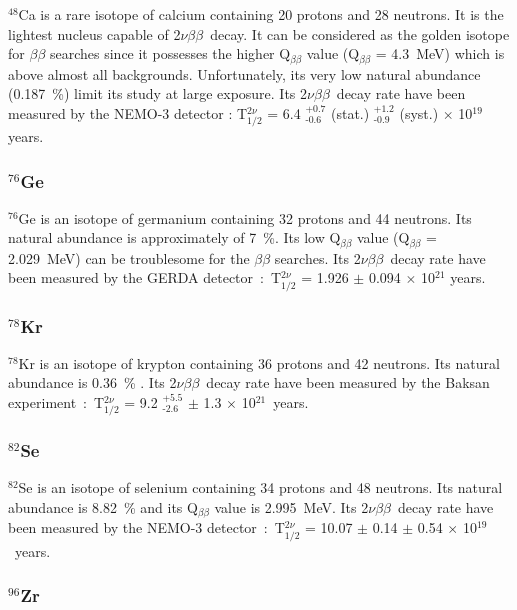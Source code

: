 \documentclass[main.tex]{subfiles}
\begin{document}
\NI $^\text{48}$Ca is a rare isotope of calcium containing 20 protons and 28 neutrons. It is the lightest nucleus capable of 2$\nu\beta\beta$~decay. It can be considered as the golden isotope for $\beta\beta$ searches since it possesses the higher Q$_{\beta\beta}$ value (Q$_{\beta\beta}$ = 4.3~MeV) which is above almost all backgrounds. Unfortunately, its very low natural abundance (0.187~\%) limit its study at large exposure. Its 2$\nu\beta\beta$~decay rate have been measured by the NEMO-3 detector : T$_{\text{1/2}}^{\text{2}\nu}$ = 6.4 $^{\text{+0.7}}_{\text{-0.6}}$ (stat.) $^{\text{+1.2}}_{\text{-0.9}}$ (syst.) $\times$ 10$^{\text{19}}$ years. 

 
\subsubsection{$^{\text{76}}$Ge}


\NI $^\text{76}$Ge is an isotope of germanium containing 32 protons and 44 neutrons. Its natural abundance is approximately of 7~\%. Its low Q$_{\beta\beta}$ value (Q$_{\beta\beta}$ = 2.029~MeV) can be troublesome for the $\beta\beta$ searches. Its 2$\nu\beta\beta$~decay rate have been measured by the GERDA detector~:~T$_{\text{1/2}}^{\text{2}\nu}$ = 1.926 $\pm$ 0.094 $\times$ 10$^{\text{21}}$ years.   


\subsubsection{$^{\text{78}}$Kr}


\NI $^\text{78}$Kr is an isotope of krypton containing 36 protons and 42 neutrons. Its natural abundance is 0.36~\% . Its 2$\nu\beta\beta$~decay rate have been measured by the Baksan experiment~:~T$_{\text{1/2}}^{\text{2}\nu}$ = 9.2 $^{\text{+5.5}}_{\text{-2.6}}$ $\pm$ 1.3 $\times$ 10$^{\text{21}}$~years.   


\subsubsection{$^{\text{82}}$Se}


\NI $^\text{82}$Se is an isotope of selenium containing 34 protons and 48 neutrons. Its natural abundance is 8.82~\% and its Q$_{\beta\beta}$ value is 2.995~MeV. Its 2$\nu\beta\beta$~decay rate have been measured by the NEMO-3 detector~:~T$_{\text{1/2}}^{\text{2}\nu}$ = 10.07 $\pm$ 0.14 $\pm$ 0.54 $\times$ 10$^{\text{19}}$~years. 


\subsubsection{$^{\text{96}}$Zr}
\end{document}
